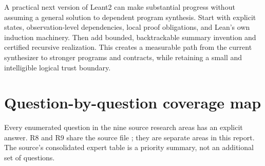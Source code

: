 \documentclass[11pt,a4paper]{article}
\theoremstyle{remark}
\begin{document}
A practical next version of Leant2 can make substantial progress without
assuming a general solution to dependent program synthesis. Start with
explicit states, observation-level dependencies, local proof obligations,
and Lean's own induction machinery. Then add bounded, backtrackable summary
invention and certified recursive realization. This creates a measurable
path from the current synthesizer to stronger programs and contracts, while
retaining a small and intelligible logical trust boundary.

\clearpage
\appendix
\section{Question-by-question coverage map}

Every enumerated question in the nine source research areas has an explicit
answer. R8 and R9 share the source file ; they are
separate areas in this report. The source's consolidated expert table is a
priority summary, not an additional set of questions.\cite{leantproposal}
\end{document}
